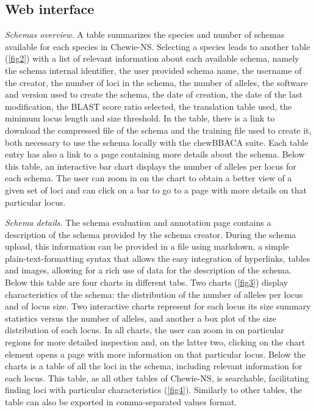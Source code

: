 \subsection{Web interface} \label{ssec:ch3_database_creation_interface}

\textit{Schemas overview}. A table summarizes the species and number of schemas available for each species in \ac{Chewie-NS}. Selecting a species leads to another table (\ref{fig2}) with a list of relevant information about each available schema, namely the schema internal identifier, the user provided schema name, the username of the creator, the number of loci in the schema, the number of alleles, the software and version used to create the schema, the date of creation, the date of the last modification, the BLAST \cite{altschul_basic_1990} score ratio selected, the translation table used, the minimum locus length and size threshold. In the table, there is a link to download the compressed file of the schema and the training file used to create it, both necessary to use the schema locally with the chewBBACA suite. Each table entry has also a link to a page containing more details about the schema. Below this table, an interactive bar chart displays the number of alleles per locus for each schema. The user can zoom in on the chart to obtain a better view of a given set of loci and can click on a bar to go to a page with more details on that particular locus.

\textit{Schema details}. The schema evaluation and annotation page contains a description of the schema provided by the schema creator. During the schema upload, this information can be provided in a file using markdown, a simple plain-text-formatting syntax that allows the easy integration of hyperlinks, tables and images, allowing for a rich use of data for the description of the schema. Below this table are four charts in different tabs. Two charts (\ref{fig3}) display characteristics of the schema: the distribution of the number of alleles per locus and of locus size. Two interactive charts represent for each locus its size summary statistics versus the number of alleles, and another a box plot of the size distribution of each locus. In all charts, the user can zoom in on particular regions for more detailed inspection and, on the latter two, clicking on the chart element opens a page with more information on that particular locus. Below the charts is a table of all the loci in the schema, including relevant information for each locus. This table, as all other tables of \ac{Chewie-NS}, is searchable, facilitating finding loci with particular characteristics (\ref{fig4}). Similarly to other tables, the table can also be exported in comma-separated values format.

